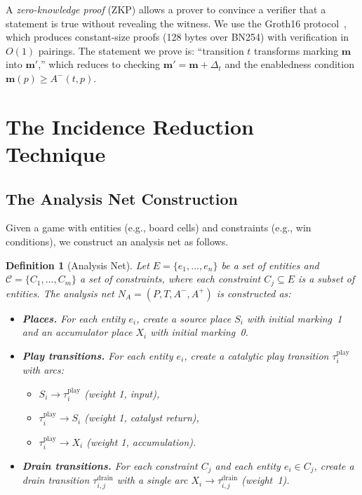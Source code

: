 \documentclass[11pt,a4paper]{article}
\newtheorem{definition}[theorem]{Definition}
\begin{document}
A \emph{zero-knowledge proof} (ZKP) allows a prover to convince a verifier that a statement is true without revealing the witness.
We use the Groth16 protocol~\cite{groth2016}, which produces constant-size proofs (128 bytes over BN254) with verification in $O(1)$ pairings.
The statement we prove is: ``transition $t$ transforms marking $\mathbf{m}$ into $\mathbf{m}'$,'' which reduces to checking $\mathbf{m}' = \mathbf{m} + \Delta_t$ and the enabledness condition $\mathbf{m}(p) \geq A^-(t,p)$.

\section{The Incidence Reduction Technique}
\label{sec:technique}

\subsection{The Analysis Net Construction}

Given a game with entities (e.g., board cells) and constraints (e.g., win conditions), we construct an analysis net as follows.

\begin{definition}[Analysis Net]\label{def:analysis-net}
Let $E = \{e_1, \ldots, e_n\}$ be a set of \emph{entities} and $\mathcal{C} = \{C_1, \ldots, C_m\}$ a set of \emph{constraints}, where each constraint $C_j \subseteq E$ is a subset of entities.
The \emph{analysis net} $N_A = (P, T, A^-, A^+)$ is constructed as:

\begin{itemize}
  \item \textbf{Places.}  For each entity $e_i$, create a \emph{source place} $S_i$ with initial marking~1 and an \emph{accumulator place} $X_i$ with initial marking~0.
  \item \textbf{Play transitions.}  For each entity $e_i$, create a \emph{catalytic play transition} $\tau_i^{\mathrm{play}}$ with arcs:
    \begin{itemize}
      \item $S_i \to \tau_i^{\mathrm{play}}$ (weight 1, input),
      \item $\tau_i^{\mathrm{play}} \to S_i$ (weight 1, catalyst return),
      \item $\tau_i^{\mathrm{play}} \to X_i$ (weight 1, accumulation).
    \end{itemize}
  \item \textbf{Drain transitions.}  For each constraint $C_j$ and each entity $e_i \in C_j$, create a \emph{drain transition} $\tau_{i,j}^{\mathrm{drain}}$ with a single arc $X_i \to \tau_{i,j}^{\mathrm{drain}}$ (weight~1).
\end{itemize}
\end{definition}
\end{document}
